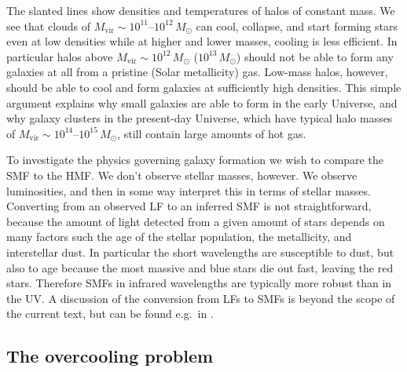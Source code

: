 \documentclass[useAMS]{aa}
\begin{document}

The slanted lines show densities and temperatures of halos of constant mass. We see that clouds of $M_\mathrm{vir}\sim10^{11}\text{--}10^{12}\,M_\odot$ can cool, collapse, and start forming stars even at low densities while at higher and lower masses, cooling is less efficient.
In particular halos above $M_\mathrm{vir}\sim10^{12}\,M_\odot$ ($10^{13}\,M_\odot$) should not be able to form any galaxies at all from a pristine (Solar metallicity) gas.
Low-mass halos, however, should be able to cool and form galaxies at sufficiently high densities.
This simple argument explains why small galaxies are able to form in the early Universe, and why galaxy clusters in the present-day Universe, which have typical halo masses of $M_\mathrm{vir}\sim10^{14}\text{--}10^{15}\,M_\odot$, still contain large amounts of hot gas.

To investigate the physics governing galaxy formation we wish to compare the SMF to the HMF.
We don't observe stellar masses, however.
We observe luminosities, and then in some way interpret this in terms of stellar masses.
Converting from an observed LF to an inferred SMF is not straightforward, because the amount of light detected from a given amount of stars depends on many factors such the age of the stellar population, the metallicity, and interstellar dust.
In particular the short wavelengths are susceptible to dust, but also to age because the most massive and blue stars die out fast, leaving the red stars.
Therefore SMFs in infrared wavelengths are typically more robust than in the UV.
A discussion of the conversion from LFs to SMFs is beyond the scope of the current text, but can be found e.g.~in \citet{Song2016}.

\subsection{The overcooling problem}
\label{sec:overcooling}
\end{document}
